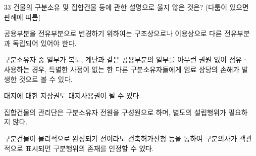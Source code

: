\begin{question}{33}
건물의 구분소유 및 집합건물 등에 관한 설명으로 옳지 않은 것은? (다툼이 있으면 판례에 따름)
\begin{choices}
  \item 공용부분을 전유부분으로 변경하기 위하여는 구조상으로나 이용상으로 다른 전유부분과 독립되어 있어야 한다.
  \item 구분소유자 중 일부가 복도, 계단과 같은 공용부분의 일부를 아무런 권원 없이 점유ㆍ사용하는 경우, 특별한 사정이 없는 한 다른 구분소유자들에게 임료 상당의 손해가 발생한 것으로 볼 수 있다.
  \item 대지에 대한 지상권도 대지사용권이 될 수 있다.
  \item 집합건물의 관리단은 구분소유자 전원을 구성원으로 하며, 별도의 설립행위가 필요하지 않다.
  \item 구분건물이 물리적으로 완성되기 전이라도 건축허가신청 등을 통하여 구분의사가 객관적으로 표시되면 구분행위의 존재를 인정할 수 있다.
\end{choices}
\end{question}
